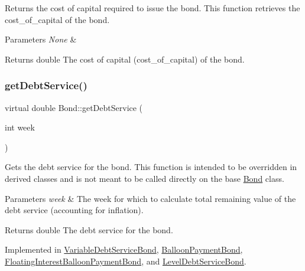 Returns the cost of capital required to issue the bond. This function retrieves the {\ttfamily cost\+\_\+of\+\_\+capital} of the bond. 


\begin{DoxyParams}{Parameters}
{\em None} & \\
\hline
\end{DoxyParams}
\begin{DoxyReturn}{Returns}
double The cost of capital ({\ttfamily cost\+\_\+of\+\_\+capital}) of the bond. 
\end{DoxyReturn}
\mbox{\label{classBond_a98d8ecaf4b36319674ebd220598996bc}} 
\subsubsection{\texorpdfstring{get\+Debt\+Service()}{getDebtService()}}
{\footnotesize\ttfamily virtual double Bond\+::get\+Debt\+Service (\begin{DoxyParamCaption}\item[{int}]{week }\end{DoxyParamCaption})\hspace{0.3cm}{\ttfamily [pure virtual]}}



Gets the debt service for the bond. This function is intended to be overridden in derived classes and is not meant to be called directly on the base {\ttfamily \mbox{\hyperlink{classBond}{Bond}}} class. 


\begin{DoxyParams}{Parameters}
{\em week} & The week for which to calculate total remaining value of the debt service (accounting for inflation). \\
\hline
\end{DoxyParams}
\begin{DoxyReturn}{Returns}
double The debt service for the bond. 
\end{DoxyReturn}


Implemented in \mbox{\hyperlink{classVariableDebtServiceBond_a575a9a41df38e005ba0a1cff3eb2b921}{Variable\+Debt\+Service\+Bond}}, \mbox{\hyperlink{classBalloonPaymentBond_a8648a2ae688f90a3b2e6689711c22b9d}{Balloon\+Payment\+Bond}}, \mbox{\hyperlink{classFloatingInterestBalloonPaymentBond_a0009a0b12e0ebeb15952561513ddc901}{Floating\+Interest\+Balloon\+Payment\+Bond}}, and \mbox{\hyperlink{classLevelDebtServiceBond_adcb3bd3c34b0cbb7b013f387ddd8b7f5}{Level\+Debt\+Service\+Bond}}.

